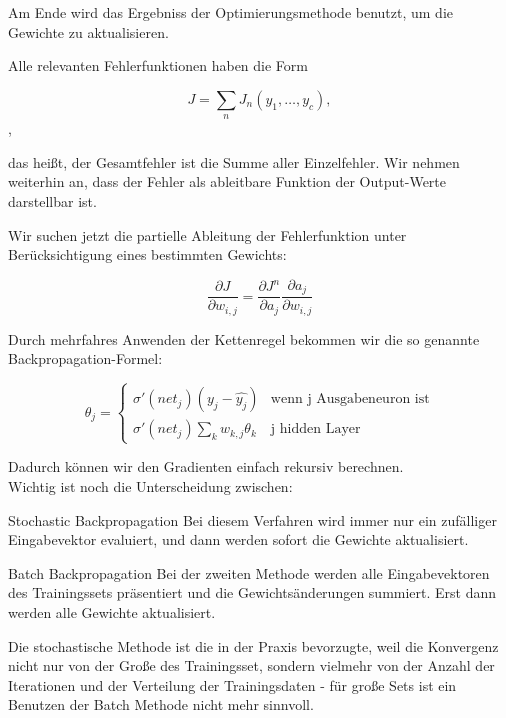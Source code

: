 Am Ende wird das Ergebniss der Optimierungsmethode benutzt, um die Gewichte zu aktualisieren. \cite{rumelhart1988learning}

Alle relevanten Fehlerfunktionen haben die Form 

\begin{equation}
J = \sum_n J_n(y_1, \ldots, y_c),
\end{equation},

das heißt, der Gesamtfehler ist die Summe aller Einzelfehler.
Wir nehmen weiterhin an, dass der Fehler als ableitbare Funktion der Output-Werte darstellbar ist.

Wir suchen jetzt die partielle Ableitung der Fehlerfunktion unter Berücksichtigung eines bestimmten Gewichts:

\begin{equation}
\frac{\partial J}{\partial w_{i,j}} = \frac{\partial J^n}{\partial a_j}  \frac{\partial a_j }{\partial w_{i,j}}
\end{equation}

Durch mehrfahres Anwenden der Kettenregel bekommen wir die so genannte Backpropagation-Formel:

\begin{equation}
\theta_j =  \begin{cases}
               \sigma ' (net_j) (y_j - \hat{y_j})           & \text{wenn j Ausgabeneuron ist}\\
               \sigma ' (net_j) \sum_k w_{k,j} \theta_k     & \text{j hidden Layer}
           \end{cases} 
\end{equation} 

Dadurch können wir den Gradienten einfach rekursiv berechnen. \cite{bishop1995neural} \\

Wichtig ist noch die Unterscheidung zwischen:

\begin{LaTeXdescription}
	\item[Stochastic Backpropagation]
	Bei diesem Verfahren wird immer nur ein zufälliger Eingabevektor evaluiert, und dann werden sofort die Gewichte aktualisiert. 
	\item[Batch Backpropagation] 
	Bei der zweiten Methode werden alle Eingabevektoren des Trainingssets präsentiert und die Gewichtsänderungen summiert. Erst dann werden alle Gewichte aktualisiert. 
\end{LaTeXdescription}\cite{duda2012pattern}

Die stochastische Methode ist die in der Praxis bevorzugte, weil die Konvergenz nicht nur von der Große des Trainingsset, sondern vielmehr von der Anzahl der Iterationen und der Verteilung der Trainingsdaten - für große Sets ist ein Benutzen der Batch Methode nicht mehr sinnvoll. \cite{bengio2012practical}  



